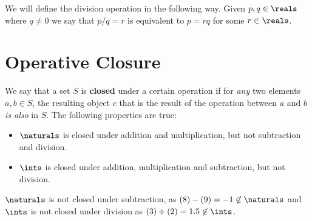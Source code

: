 We will define the division operation in the following way. Given 
$p, q \in \reals$ where $q \neq 0$ we say that $p/q = r$ is equivalent
to $p = rq$ for some $r \in \reals$. 


\section{Operative Closure}
We say that a set $S$ is \textbf{closed} under a certain operation if for
\emph{any} two elements $a, b \in S$, the resulting object $c$ that is the
result of the operation between $a$ and $b$ \emph{is also} in $S$. The
following properties are true:

\begin{itemize}
  \item $\naturals$ is closed under addition and multiplication, but not
  subtraction and division.
  \item $\ints$ is closed under addition, multiplication and subtraction, but
  not division.
\end{itemize}

$\naturals$ is not closed under subtraction, as
$(8) - (9) = -1 \not \in \naturals$ and $\ints$ is not closed under division
as $(3) \div (2) = 1.5 \not\in \ints$.
